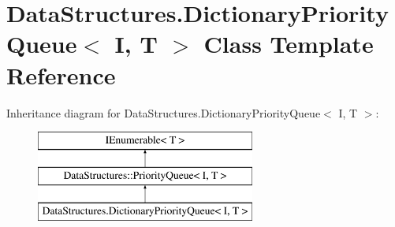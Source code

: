 \hypertarget{class_data_structures_1_1_dictionary_priority_queue}{}\section{Data\+Structures.\+Dictionary\+Priority\+Queue$<$ I, T $>$ Class Template Reference}
\label{class_data_structures_1_1_dictionary_priority_queue}
Inheritance diagram for Data\+Structures.\+Dictionary\+Priority\+Queue$<$ I, T $>$\+:\begin{figure}[H]
\begin{center}
\leavevmode
\includegraphics[height=3.000000cm]{class_data_structures_1_1_dictionary_priority_queue}
\end{center}
\end{figure}
